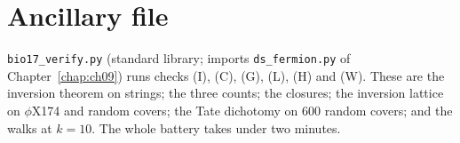 \section*{Ancillary file}
\texttt{bio17\_verify.py} (standard library; imports \texttt{ds\_fermion.py} of Chapter~\ref{chap:ch09}) runs checks
(I), (C), (G), (L), (H) and (W). These are the inversion theorem on strings; the three counts; the
closures; the inversion lattice on $\phi$X174 and random covers; the Tate dichotomy on $600$ random
covers; and the walks at $k=10$. The whole battery takes under two minutes.

